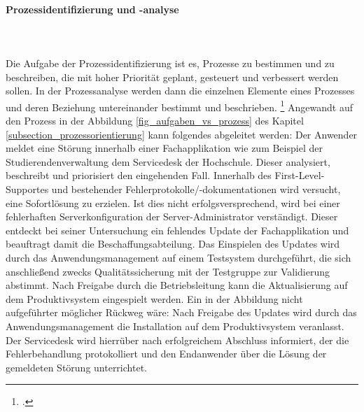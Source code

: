 \paragraph{Prozessidentifizierung und -analyse}\mbox{}\\\\
\label{paragraph_prozessidenifizierung}
Die Aufgabe der Prozessidentifizierung ist es, Prozesse zu bestimmen und zu beschreiben, die mit hoher Priorität geplant, gesteuert und verbessert werden sollen. In der Prozessanalyse werden dann die einzelnen Elemente eines Prozesses und deren Beziehung untereinander bestimmt und beschrieben. \footcite[Vgl.][276]{heinrich_stelzer_2011}
Angewandt auf den Prozess in der Abbildung \ref{fig_aufgaben_vs_prozess} des Kapitel \ref{subsection_prozessorientierung} kann folgendes abgeleitet werden:
Der Anwender meldet eine Störung innerhalb einer Fachapplikation wie zum Beispiel der Studierendenverwaltung dem Servicedesk der Hochschule. Dieser analysiert, beschreibt und priorisiert den eingehenden Fall. Innerhalb des First-Level-Supportes und bestehender Fehlerprotokolle/-dokumentationen wird versucht, eine Sofortlösung zu erzielen. Ist dies nicht erfolgsversprechend, wird bei einer fehlerhaften Serverkonfiguration der Server-Administrator verständigt. Dieser entdeckt bei seiner Untersuchung ein fehlendes Update der Fachapplikation und beauftragt damit die Beschaffungsabteilung. Das Einspielen des Updates wird durch das Anwendungsmanagement auf einem Testsystem durchgeführt, die sich anschließend zwecks Qualitätssicherung mit der Testgruppe zur Validierung abstimmt. Nach Freigabe durch die Betriebsleitung kann die Aktualisierung auf dem Produktivsystem eingespielt werden.
Ein in der Abbildung nicht aufgeführter möglicher Rückweg wäre: Nach Freigabe des Updates wird durch das Anwendungsmanagement die Installation auf dem Produktivsystem veranlasst. Der Servicedesk wird hierrüber nach erfolgreichem Abschluss informiert, der die Fehlerbehandlung protokolliert und den Endanwender über die Lösung der gemeldeten Störung unterrichtet.

